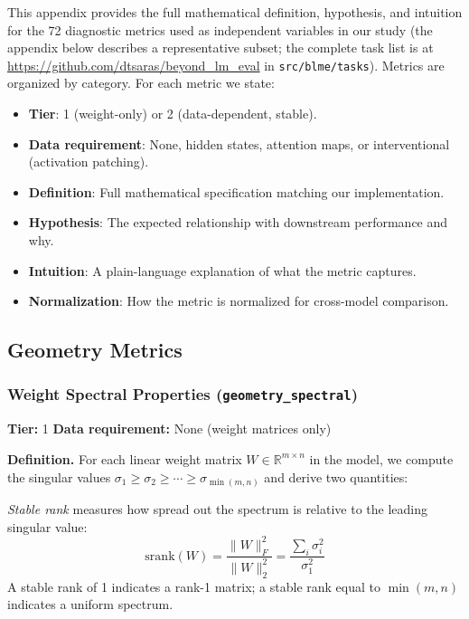 \documentclass[preprint]{neurips_2025}
\begin{document}
This appendix provides the full mathematical definition, hypothesis, and intuition for the 72 diagnostic metrics used as independent variables in our study (the appendix below describes a representative subset; the complete task list is at \url{https://github.com/dtsaras/beyond_lm_eval} in \texttt{src/blme/tasks}). Metrics are organized by category. For each metric we state:
\begin{itemize}
  \item \textbf{Tier}: 1 (weight-only) or 2 (data-dependent, stable).
  \item \textbf{Data requirement}: None, hidden states, attention maps, or interventional (activation patching).
  \item \textbf{Definition}: Full mathematical specification matching our implementation.
  \item \textbf{Hypothesis}: The expected relationship with downstream performance and why.
  \item \textbf{Intuition}: A plain-language explanation of what the metric captures.
  \item \textbf{Normalization}: How the metric is normalized for cross-model comparison.
\end{itemize}

\subsection{Geometry Metrics}
\label{app:geometry}

\subsubsection{Weight Spectral Properties (\texttt{geometry\_spectral})}
\label{app:spectral}

\textbf{Tier:} 1 \quad \textbf{Data requirement:} None (weight matrices only)

\textbf{Definition.}
For each linear weight matrix $W \in \mathbb{R}^{m \times n}$ in the model, we compute the singular values $\sigma_1 \geq \sigma_2 \geq \cdots \geq \sigma_{\min(m,n)}$ and derive two quantities:

\emph{Stable rank} measures how spread out the spectrum is relative to the leading singular value:
\begin{equation}
  \text{srank}(W) = \frac{\|W\|_F^2}{\|W\|_2^2} = \frac{\sum_i \sigma_i^2}{\sigma_1^2}
\end{equation}
A stable rank of 1 indicates a rank-1 matrix; a stable rank equal to $\min(m,n)$ indicates a uniform spectrum.
\end{document}
